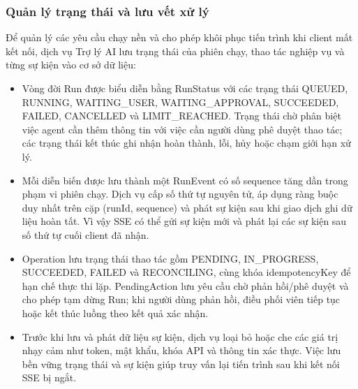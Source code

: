 \documentclass[../BTL.tex]{subfiles}
\begin{document}
\subsubsection{Quản lý trạng thái và lưu vết xử lý}

Để quản lý các yêu cầu chạy nền và cho phép khôi phục tiến trình khi client mất kết nối, dịch vụ Trợ lý AI lưu trạng thái của phiên chạy, thao tác nghiệp vụ và từng sự kiện vào cơ sở dữ liệu:
\begin{itemize}[leftmargin=*, nosep]
    \item Vòng đời \textnormal{Run} được biểu diễn bằng \textnormal{RunStatus} với các trạng thái \textnormal{QUEUED}, \textnormal{RUNNING}, \textnormal{WAITING\_USER}, \textnormal{WAITING\_APPROVAL}, \textnormal{SUCCEEDED}, \textnormal{FAILED}, \textnormal{CANCELLED} và \textnormal{LIMIT\_REACHED}. Trạng thái chờ phân biệt việc agent cần thêm thông tin với việc cần người dùng phê duyệt thao tác; các trạng thái kết thúc ghi nhận hoàn thành, lỗi, hủy hoặc chạm giới hạn xử lý.
    \item Mỗi diễn biến được lưu thành một \textnormal{RunEvent} có số \textnormal{sequence} tăng dần trong phạm vi phiên chạy. Dịch vụ cấp số thứ tự nguyên tử, áp dụng ràng buộc duy nhất trên cặp \textnormal{(runId, sequence)} và phát sự kiện sau khi giao dịch ghi dữ liệu hoàn tất. Vì vậy SSE có thể gửi sự kiện mới và phát lại các sự kiện sau số thứ tự cuối client đã nhận.
    \item \textnormal{Operation} lưu trạng thái thao tác gồm \textnormal{PENDING}, \textnormal{IN\_PROGRESS}, \textnormal{SUCCEEDED}, \textnormal{FAILED} và \textnormal{RECONCILING}, cùng khóa \textnormal{idempotencyKey} để hạn chế thực thi lặp. \textnormal{PendingAction} lưu yêu cầu chờ phản hồi/phê duyệt và cho phép tạm dừng Run; khi người dùng phản hồi, điều phối viên tiếp tục hoặc kết thúc luồng theo kết quả xác nhận.
    \item Trước khi lưu và phát dữ liệu sự kiện, dịch vụ loại bỏ hoặc che các giá trị nhạy cảm như token, mật khẩu, khóa API và thông tin xác thực. Việc lưu bền vững trạng thái và sự kiện giúp truy vấn lại tiến trình sau khi kết nối SSE bị ngắt.
\end{itemize}
\end{document}
